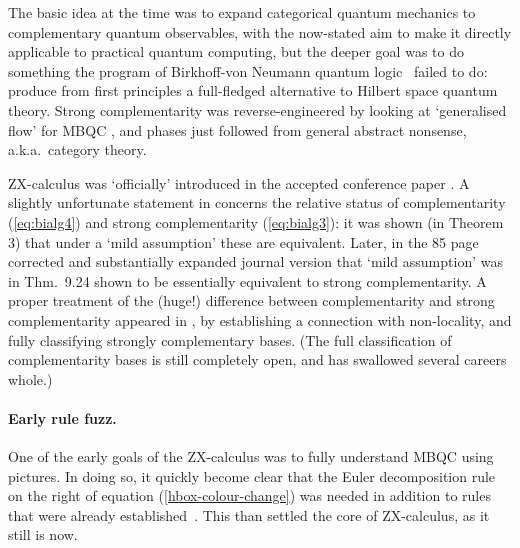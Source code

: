\documentclass[11pt]{article}
\theoremstyle{definition}
\begin{document}
{The basic idea at the time was to expand categorical quantum mechanics to complementary quantum observables, with the now-stated aim to make it directly applicable to practical quantum computing, but the deeper goal was to do something the program of Birkhoff-von Neumann quantum logic~\cite{BvN} failed to do:
produce from first principles a full-fledged alternative to Hilbert space quantum theory. Strong complementarity was reverse-engineered by looking at `generalised flow' for MBQC \cite{DP2},  and phases just followed from general abstract nonsense, a.k.a.~category theory. 

  
ZX-calculus was `officially' introduced in the accepted conference paper \cite[ICALP, 2008]{CD1}. A slightly unfortunate statement in \cite{CD1} concerns the relative status of complementarity (\ref{eq:bialg4}) and strong complementarity (\ref{eq:bialg3}): it was shown (in Theorem 3) that under a `mild assumption' these are equivalent.  Later, in the 85 page  corrected and substantially expanded journal version \cite[NJP, 2011]{CD2} that `mild assumption' was in Thm.~9.24 shown to be essentially equivalent to strong complementarity. A proper treatment of the (huge!) difference between complementarity and strong complementarity appeared in \cite{CDKZ}, by establishing a connection with non-locality, and fully classifying strongly complementary bases. (The full classification of complementarity bases is still completely open, and has swallowed several careers whole.)   

\paragraph{Early rule fuzz.} One of the early goals of the ZX-calculus was to fully understand MBQC using pictures. In doing so, it quickly become clear that the Euler decomposition rule on the right of equation (\ref{hbox-colour-change}) was needed in addition to rules that were already established~\cite{duncan2009graph}.
This than settled the core of ZX-calculus, as it still is now.

}
\end{document}
